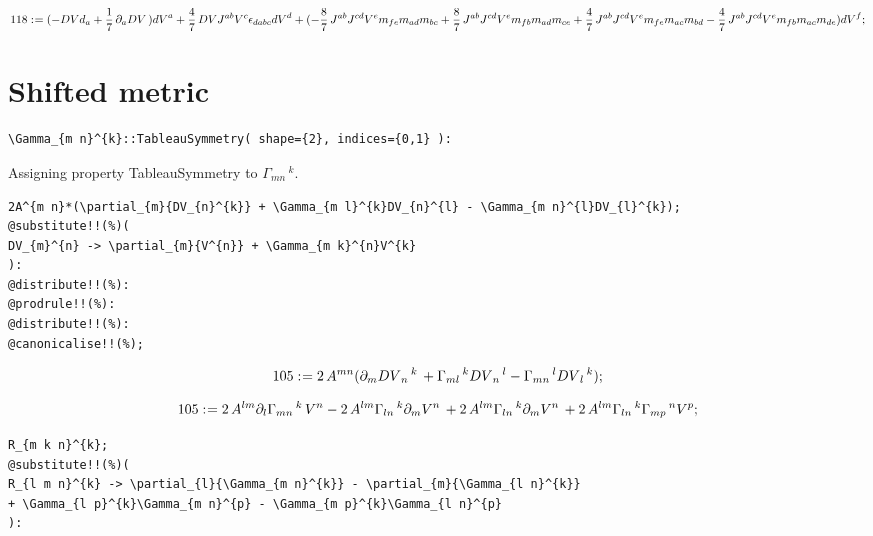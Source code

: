 \documentclass[11pt]{article}
\def\specialcolon{\mathrel{\mathop{:}}\hspace{-.5em}}
\begin{document}
\begin{dmath*}[compact, spread=2pt]
118\specialcolon{}= ( - DV {d}_{a} + \frac{1}{7}\, {\partial}_{a}{DV}\, ) {dV}^{a} + \frac{4}{7}\, DV {J}^{a b} {V}^{c} {\epsilon}_{d a b c} {dV}^{d} + ( - \frac{8}{7}\, {J}^{a b} {J}^{c d} {V}^{e} {m}_{f e} {m}_{a d} {m}_{b c} + \frac{8}{7}\, {J}^{a b} {J}^{c d} {V}^{e} {m}_{f b} {m}_{a d} {m}_{c e} + \frac{4}{7}\, {J}^{a b} {J}^{c d} {V}^{e} {m}_{f e} {m}_{a c} {m}_{b d} - \frac{4}{7}\, {J}^{a b} {J}^{c d} {V}^{e} {m}_{f b} {m}_{a c} {m}_{d e}) {dV}^{f};
\end{dmath*}
\section*{Shifted metric}
{\color[named]{Blue}\begin{verbatim}
\Gamma_{m n}^{k}::TableauSymmetry( shape={2}, indices={0,1} ):
\end{verbatim}}
Assigning property TableauSymmetry to ${\Gamma}_{m n}\,^{k}$.
\\
{\color[named]{Blue}\begin{verbatim}
2A^{m n}*(\partial_{m}{DV_{n}^{k}} + \Gamma_{m l}^{k}DV_{n}^{l} - \Gamma_{m n}^{l}DV_{l}^{k});
@substitute!!(%)(
DV_{m}^{n} -> \partial_{m}{V^{n}} + \Gamma_{m k}^{n}V^{k}
):
@distribute!!(%):
@prodrule!!(%):
@distribute!!(%):
@canonicalise!!(%);
\end{verbatim}}





\begin{dmath*}[compact, spread=2pt]
105\specialcolon{}= 2\, {A}^{m n} ({\partial}_{m}{{DV}_{n}\,^{k}}\,  + {\Gamma}_{m l}\,^{k} {DV}_{n}\,^{l} - {\Gamma}_{m n}\,^{l} {DV}_{l}\,^{k});
\end{dmath*}





\begin{dmath*}[compact, spread=2pt]
105\specialcolon{}= 2\, {A}^{l m} {\partial}_{l}{{\Gamma}_{m n}\,^{k}}\,  {V}^{n} - 2\, {A}^{l m} {\Gamma}_{l n}\,^{k} {\partial}_{m}{{V}^{n}}\,  + 2\, {A}^{l m} {\Gamma}_{l n}\,^{k} {\partial}_{m}{{V}^{n}}\,  + 2\, {A}^{l m} {\Gamma}_{l n}\,^{k} {\Gamma}_{m p}\,^{n} {V}^{p};
\end{dmath*}
{\color[named]{Blue}\begin{verbatim}
R_{m k n}^{k};
@substitute!!(%)(
R_{l m n}^{k} -> \partial_{l}{\Gamma_{m n}^{k}} - \partial_{m}{\Gamma_{l n}^{k}}
+ \Gamma_{l p}^{k}\Gamma_{m n}^{p} - \Gamma_{m p}^{k}\Gamma_{l n}^{p}
):
\end{verbatim}}
\end{document}
